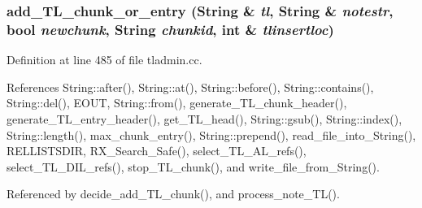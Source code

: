 \subsubsection{ add\_\-TL\_\-chunk\_\-or\_\-entry ({\bf String} \& {\em tl}, {\bf String} \& {\em notestr}, bool {\em newchunk}, {\bf String} {\em chunkid}, int \& {\em tlinsertloc})}\label{dil2al_8hh_a325}




Definition at line 485 of file tladmin.cc.

References String::after(), String::at(), String::before(), String::contains(), String::del(), EOUT, String::from(), generate\_\-TL\_\-chunk\_\-header(), generate\_\-TL\_\-entry\_\-header(), get\_\-TL\_\-head(), String::gsub(), String::index(), String::length(), max\_\-chunk\_\-entry(), String::prepend(), read\_\-file\_\-into\_\-String(), RELLISTSDIR, RX\_\-Search\_\-Safe(), select\_\-TL\_\-AL\_\-refs(), select\_\-TL\_\-DIL\_\-refs(), stop\_\-TL\_\-chunk(), and write\_\-file\_\-from\_\-String().

Referenced by decide\_\-add\_\-TL\_\-chunk(), and process\_\-note\_\-TL().



